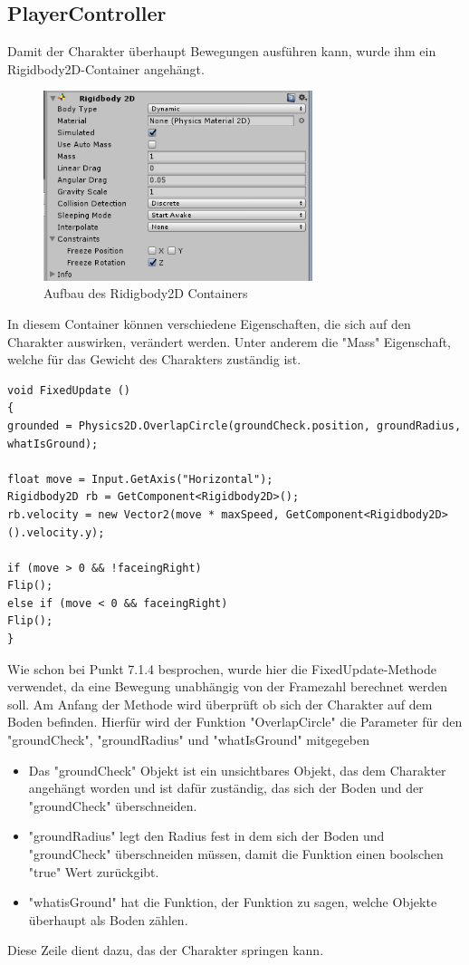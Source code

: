 \subsection{PlayerController}
Damit der Charakter überhaupt Bewegungen ausführen kann, wurde ihm ein Rigidbody2D-Container angehängt.
\begin{figure}[htbp] 
	\centering
	\includegraphics[width=0.7\textwidth]{images/Ridigbody2D.png}
	\caption{Aufbau des Ridigbody2D Containers}
\end{figure}
In diesem Container können verschiedene Eigenschaften, die sich auf den Charakter auswirken, verändert werden. Unter anderem die "Mass" Eigenschaft, welche für das Gewicht des Charakters zuständig ist.

\begin{lstlisting}[language={[Sharp]C}]
void FixedUpdate ()
{
grounded = Physics2D.OverlapCircle(groundCheck.position, groundRadius, whatIsGround);

float move = Input.GetAxis("Horizontal");
Rigidbody2D rb = GetComponent<Rigidbody2D>();
rb.velocity = new Vector2(move * maxSpeed, GetComponent<Rigidbody2D>().velocity.y);

if (move > 0 && !faceingRight)
Flip();
else if (move < 0 && faceingRight)
Flip();
}
\end{lstlisting}

Wie schon bei Punkt 7.1.4 besprochen, wurde hier die FixedUpdate-Methode verwendet, da eine Bewegung unabhängig von der Framezahl berechnet werden soll. Am Anfang der Methode wird überprüft ob sich der Charakter auf dem Boden befinden. Hierfür wird der Funktion "OverlapCircle" die Parameter für den "groundCheck", "groundRadius" und "whatIsGround" mitgegeben
\begin{itemize}
	\item Das "groundCheck" Objekt ist ein unsichtbares Objekt, das dem Charakter angehängt worden und ist dafür zuständig, das sich der Boden und der "groundCheck" überschneiden.
	\item "groundRadius" legt den Radius fest in dem sich der Boden und "groundCheck" überschneiden müssen, damit die Funktion einen boolschen "true" Wert zurückgibt.
	\item "whatisGround" hat die Funktion, der Funktion zu sagen, welche Objekte überhaupt als Boden zählen.
\end{itemize}
Diese Zeile dient dazu, das der Charakter springen kann.

